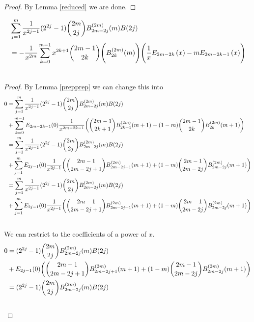 \documentclass[fleqn,a4paper,9pt]{article}
\begin{document}
\begin{flushleft}
\begin{proof}
By Lemma \ref{reduced} we are done.
\end{proof}

\begin{lemma}\label{oddeven}
\begin{align}
&\sum_{j=1}^{m}\frac{1}{x^{2j-1}}(2^{2j}-1)\binom{2m}{2j}B_{2m-2j}^{(2m)}(m) B(2 j)\\\notag
&=-\frac{1}{x^{2m}}\sum_{k=0}^{m-1}x^{2k+1}\binom{2m-1}{2k}\Biggl(B_{2k}^{(2m)}(m)\Biggr)\Biggl(\frac{1}{x}E_{2m-2k}\left(x\right)-mE_{2m-2k-1}\left(x\right)\Biggr)\\\notag
\end{align}
\end{lemma}
\begin{proof}
By Lemma \ref{prepprep} we can change this into
\begin{align}
0&=\sum_{j=1}^{m}\frac{1}{x^{2j-1}}(2^{2j}-1)\binom{2m}{2j}B_{2m-2j}^{(2m)}(m) B(2 j)\\\notag
&+\sum_{k=0}^{m-1}E_{2m-2k-1}(0)\frac{1}{x^{2m-2k-1}}\biggl(\binom{2m-1}{2k+1}B_{2k+1}^{(2m)}(m+1)+(1-m)\binom{2m-1}{2k}B_{2k}^{(2m)}(m+1)\biggr)\\\notag
&=\sum_{j=1}^{m}\frac{1}{x^{2j-1}}(2^{2j}-1)\binom{2m}{2j}B_{2m-2j}^{(2m)}(m) B(2 j)\\\notag
&+\sum_{j=1}^{m}E_{2j-1}(0)\frac{1}{x^{2j-1}}\biggl(\binom{2m-1}{2m-2j+1}B_{2m-2j+1}^{(2m)}(m+1)+(1-m)\binom{2m-1}{2m-2j}B_{2m-2j}^{(2m)}(m+1)\biggr)\\\notag
&=\sum_{j=1}^{m}\frac{1}{x^{2j-1}}(2^{2j}-1)\binom{2m}{2j}B_{2m-2j}^{(2m)}(m) B(2 j)\\\notag
&+\sum_{j=1}^{m}E_{2j-1}(0)\frac{1}{x^{2j-1}}\biggl(\binom{2m-1}{2m-2j+1}B_{2m-2j+1}^{(2m)}(m+1)+(1-m)\binom{2m-1}{2m-2j}B_{2m-2j}^{(2m)}(m+1)\biggr)\\\notag
\end{align}
We can restrict to the coefficients of a power of $x$.
\begin{align}
0&=(2^{2j}-1)\binom{2m}{2j}B_{2m-2j}^{(2m)}(m) B(2 j)\\\notag
&+E_{2j-1}(0)\biggl(\binom{2m-1}{2m-2j+1}B_{2m-2j+1}^{(2m)}(m+1)+(1-m)\binom{2m-1}{2m-2j}B_{2m-2j}^{(2m)}(m+1)\biggr)\\\notag
&=(2^{2j}-1)\binom{2m}{2j}B_{2m-2j}^{(2m)}(m) B(2 j)\\\notag

\end{align}
\end{proof}
\end{flushleft}
\end{document}
